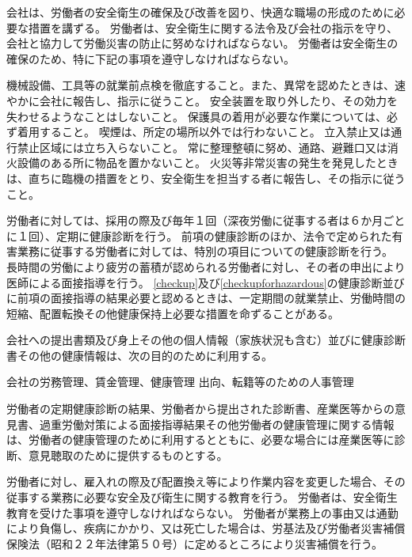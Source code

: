 \documentclass[10pt,a4paper,uplatex]{jsarticle}
\begin{document}
会社は、労働者の安全衛生の確保及び改善を図り、快適な職場の形成のために必要な措置を講ずる。
\term
労働者は、安全衛生に関する法令及び会社の指示を守り、会社と協力して労働災害の防止に努めなければならない。
\term
労働者は安全衛生の確保のため、特に下記の事項を遵守しなければならない。
\begin{enumerate}
    \itm 機械設備、工具等の就業前点検を徹底すること。また、異常を認めたときは、速やかに会社に報告し、指示に従うこと。
    \itm 安全装置を取り外したり、その効力を失わせるようなことはしないこと。
    \itm 保護具の着用が必要な作業については、必ず着用すること。
    \itm 喫煙は、所定の場所以外では行わないこと。
    \itm 立入禁止又は通行禁止区域には立ち入らないこと。
    \itm 常に整理整頓に努め、通路、避難口又は消火設備のある所に物品を置かないこと。
    \itm 火災等非常災害の発生を発見したときは、直ちに臨機の措置をとり、安全衛生を担当する者に報告し、その指示に従うこと。
\end{enumerate}

労働者に対しては、採用の際及び毎年１回（深夜労働に従事する者は６か月ごとに１回）、定期に健康診断を行う。
\label{checkup}
\term
 前項の健康診断のほか、法令で定められた有害業務に従事する労働者に対しては、特別の項目についての健康診断を行う。
\label{checkupforhazardous}
\term
長時間の労働により疲労の蓄積が認められる労働者に対し、その者の申出により医師による面接指導を行う。
\term
\ref{checkup}及び\ref{checkupforhazardous}の健康診断並びに前項の面接指導の結果必要と認めるときは、一定期間の就業禁止、労働時間の短縮、配置転換その他健康保持上必要な措置を命ずることがある。

会社への提出書類及び身上その他の個人情報（家族状況も含む）並びに健康診断書その他の健康情報は、次の目的のために利用する。
\begin{enumerate}
    \itm 会社の労務管理、賃金管理、健康管理
    \itm 出向、転籍等のための人事管理
\end{enumerate}
\term
労働者の定期健康診断の結果、労働者から提出された診断書、産業医等からの意見書、過重労働対策による面接指導結果その他労働者の健康管理に関する情報は、労働者の健康管理のために利用するとともに、必要な場合には産業医等に診断、意見聴取のために提供するものとする。

労働者に対し、雇入れの際及び配置換え等により作業内容を変更した場合、その従事する業務に必要な安全及び衛生に関する教育を行う。
\term
労働者は、安全衛生教育を受けた事項を遵守しなければならない。
労働者が業務上の事由又は通勤により負傷し、疾病にかかり、又は死亡した場合は、労基法及び労働者災害補償保険法（昭和２２年法律第５０号）に定めるところにより災害補償を行う。
\end{document}
